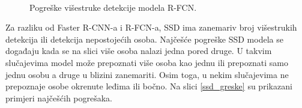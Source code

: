 \begin{figure}[H]
 \
\caption{Pogreške višestruke detekcije modela R-FCN.}
\label{rfcn_greske}
\end{figure}

Za razliku od Faster R-CNN-a i R-FCN-a, SSD ima zanemariv broj višestrukih detekcija ili detekcija nepostojećih osoba. Najčešće pogreške SSD modela se događaju kada se na slici više osoba nalazi jedna pored druge. U takvim slučajevima model može prepoznati više osoba kao jednu ili prepoznati samo jednu osobu a druge u blizini zanemariti. Osim toga, u nekim slučajevima ne prepoznaje osobe okrenute leđima ili bočno. Na slici \ref{ssd_greske} su prikazani primjeri najčešćih pogrešaka.

